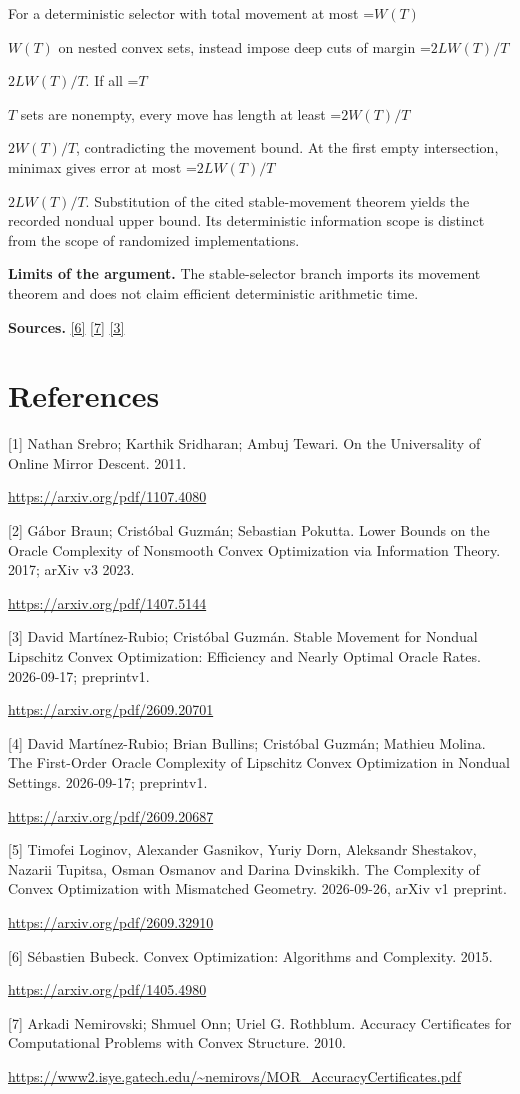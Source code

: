 \documentclass[10pt,a4paper]{article}
\newcommand{\AtlasMath}[1]{\par\begingroup\centering\setbox0=\hbox{$\displaystyle #1$}\ifdim\wd0>1.4\linewidth\typeout{ATLAS WIDE FORMULA: \the\wd0}\fi\ifdim\wd0>\linewidth\resizebox{\linewidth}{!}{\box0}\else\box0\fi\par\endgroup}
\newcommand{\AtlasInlineMath}[1]{\begingroup\setbox0=\hbox{$#1$}\ifdim\wd0>.4\linewidth\endgroup\AtlasMath{#1}\else\endgroup$#1$\fi}
\begin{document}
For a deterministic selector with total movement at most \AtlasInlineMath{W(T)} on nested convex sets, instead impose deep cuts of margin \AtlasInlineMath{2LW(T)/T}. If all \AtlasInlineMath{T} sets are nonempty, every move has length at least \AtlasInlineMath{2W(T)/T}, contradicting the movement bound. At the first empty intersection, minimax gives error at most \AtlasInlineMath{2LW(T)/T}. Substitution of the cited stable-movement theorem yields the recorded nondual upper bound. Its deterministic information scope is distinct from the scope of randomized implementations.

\textbf{Limits of the argument.} The stable-selector branch imports its movement theorem and does not claim efficient deterministic arithmetic time.

\textbf{Sources.} \href{https://arxiv.org/pdf/1405.4980}{[6]} \href{https://www2.isye.gatech.edu/~nemirovs/MOR_AccuracyCertificates.pdf}{[7]} \href{https://arxiv.org/pdf/2609.20701}{[3]}

\section{References}
[1] Nathan Srebro; Karthik Sridharan; Ambuj Tewari. On the Universality of Online Mirror Descent. 2011.

\url{https://arxiv.org/pdf/1107.4080}

[2] Gábor Braun; Cristóbal Guzmán; Sebastian Pokutta. Lower Bounds on the Oracle Complexity of Nonsmooth Convex Optimization via Information Theory. 2017; arXiv v3 2023.

\url{https://arxiv.org/pdf/1407.5144}

[3] David Martínez-Rubio; Cristóbal Guzmán. Stable Movement for Nondual Lipschitz Convex Optimization: Efficiency and Nearly Optimal Oracle Rates. 2026-09-17; preprintv1.

\url{https://arxiv.org/pdf/2609.20701}

[4] David Martínez-Rubio; Brian Bullins; Cristóbal Guzmán; Mathieu Molina. The First-Order Oracle Complexity of Lipschitz Convex Optimization in Nondual Settings. 2026-09-17; preprintv1.

\url{https://arxiv.org/pdf/2609.20687}

[5] Timofei Loginov, Alexander Gasnikov, Yuriy Dorn, Aleksandr Shestakov, Nazarii Tupitsa, Osman Osmanov and Darina Dvinskikh. The Complexity of Convex Optimization with Mismatched Geometry. 2026-09-26, arXiv v1 preprint.

\url{https://arxiv.org/pdf/2609.32910}

[6] Sébastien Bubeck. Convex Optimization: Algorithms and Complexity. 2015.

\url{https://arxiv.org/pdf/1405.4980}

[7] Arkadi Nemirovski; Shmuel Onn; Uriel G. Rothblum. Accuracy Certificates for Computational Problems with Convex Structure. 2010.

\url{https://www2.isye.gatech.edu/~nemirovs/MOR_AccuracyCertificates.pdf}
\end{document}
